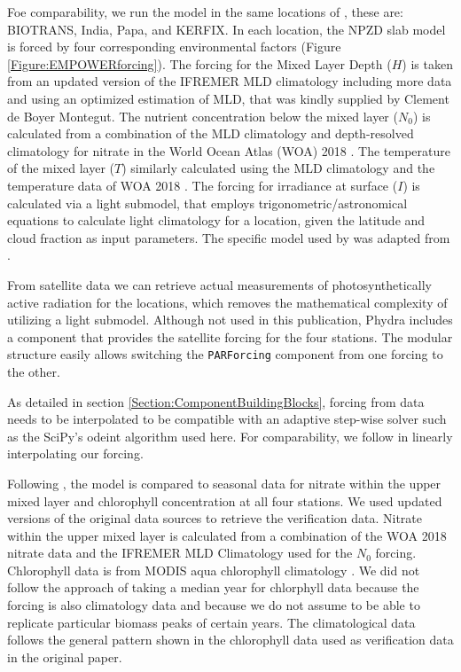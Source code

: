 \documentclass[journal abbreviation, manuscript]{copernicus}
\begin{document}
Foe comparability, we run the model in the same locations of \citet{Anderson2015c}, these are: BIOTRANS, India, Papa, and KERFIX. In each location, the NPZD slab model is forced by four corresponding environmental factors (Figure \ref{Figure:EMPOWERforcing}). 
The forcing for the Mixed Layer Depth ($H$) is taken from an updated version of the IFREMER MLD climatology  \citep{DeBoyerMontegut2004} including more data and using an optimized estimation of MLD, that was kindly supplied by Clement de Boyer Montegut.
The nutrient concentration below the mixed layer ($N_0$) is calculated from a combination of the MLD climatology and depth-resolved climatology for nitrate in the World Ocean Atlas (WOA) 2018 \citep{Garcia2019WORLDSilicate}. The temperature of the mixed layer ($T$) similarly calculated using the MLD climatology and the temperature data of WOA 2018 \citep{Locarnini2019WorldTemperature}.
The forcing for irradiance at surface ($I$) is calculated via a light submodel, that employs trigonometric/astronomical equations to calculate light climatology for a location, given the latitude and cloud fraction as input parameters. The specific model used by \citet{Anderson2015c} was adapted from \citet{Shine1984ParametrizationAlbedo}.

From satellite data we can retrieve actual measurements of photosynthetically active radiation for the locations, which removes the mathematical complexity of utilizing a light submodel. 
Although not used in this publication, Phydra includes a component that provides the satellite forcing for the four stations. The modular structure easily allows switching the \texttt{PARForcing} component from one forcing to the other.

As detailed in section \ref{Section:ComponentBuildingBlocks}, forcing from data needs to be interpolated to be compatible with an adaptive step-wise solver such as the SciPy's odeint algorithm used here. For comparability, we follow \citet{Anderson2015c} in linearly interpolating our forcing.

Following \citet{Anderson2015c}, the model is compared to seasonal data for nitrate within the upper mixed layer and chlorophyll concentration at all four stations. We used updated versions of the original data sources to retrieve the verification data. Nitrate within the upper mixed layer is calculated from a combination of the WOA 2018 nitrate data and the IFREMER MLD Climatology used for the $N_0$ forcing. Chlorophyll data is from MODIS aqua chlorophyll climatology \citep{NASAGoddardSpaceFlightCenterOceanEcologyLaboratoryOceanBiologyProcessingGroup}. We did not follow the approach of taking a median year for chlorphyll data because the forcing is also climatology data and because we do not assume to be able to replicate particular biomass peaks of certain years. The climatological data follows the general pattern shown in the chlorophyll data used as verification data in the original paper.
\end{document}

